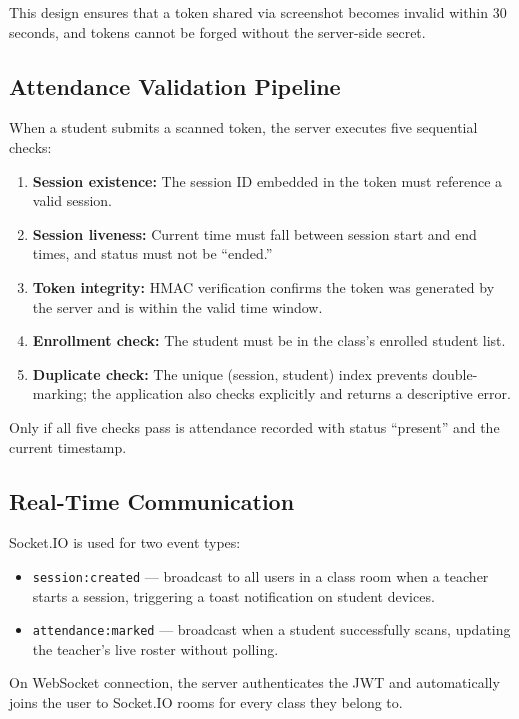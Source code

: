 \documentclass[conference]{IEEEtran}
\begin{document}
This design ensures that a token shared via screenshot becomes invalid within 30 seconds, and tokens cannot be forged without the server-side secret.

\subsection{Attendance Validation Pipeline}
When a student submits a scanned token, the server executes five sequential checks:
\begin{enumerate}
\item \textbf{Session existence:} The session ID embedded in the token must reference a valid session.
\item \textbf{Session liveness:} Current time must fall between session start and end times, and status must not be ``ended.''
\item \textbf{Token integrity:} HMAC verification confirms the token was generated by the server and is within the valid time window.
\item \textbf{Enrollment check:} The student must be in the class's enrolled student list.
\item \textbf{Duplicate check:} The unique (session, student) index prevents double-marking; the application also checks explicitly and returns a descriptive error.
\end{enumerate}

Only if all five checks pass is attendance recorded with status ``present'' and the current timestamp.

\subsection{Real-Time Communication}
Socket.IO is used for two event types:
\begin{itemize}
\item \texttt{session:created} --- broadcast to all users in a class room when a teacher starts a session, triggering a toast notification on student devices.
\item \texttt{attendance:marked} --- broadcast when a student successfully scans, updating the teacher's live roster without polling.
\end{itemize}

On WebSocket connection, the server authenticates the JWT and automatically joins the user to Socket.IO rooms for every class they belong to.
\end{document}
